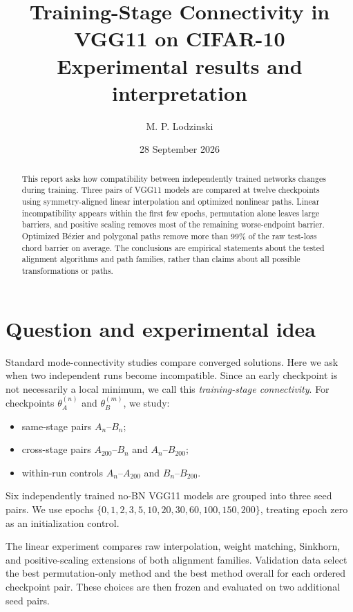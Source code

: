 \documentclass[11pt]{article}
\title{Training-Stage Connectivity in VGG11 on CIFAR-10\\
\large Experimental results and interpretation}
\author{M. P. Lodzinski}
\date{28 September 2026}
\begin{document}
\maketitle

\begin{abstract}
This report asks how compatibility between independently trained networks
changes during training.  Three pairs of VGG11 models are compared at twelve
checkpoints using symmetry-aligned linear interpolation and optimized nonlinear
paths.  Linear incompatibility appears within the first few epochs, permutation
alone leaves large barriers, and positive scaling removes most of the
remaining worse-endpoint barrier.  Optimized B\'ezier and polygonal paths remove
more than 99\% of the raw test-loss chord barrier on average.  The conclusions
are empirical statements about the tested alignment algorithms and path
families, rather than claims about all possible transformations or paths.
\end{abstract}

\section{Question and experimental idea}

Standard mode-connectivity studies compare converged solutions.  Here we ask
when two independent runs become incompatible.  Since an early checkpoint is
not necessarily a local minimum, we call this \emph{training-stage
connectivity}.  For checkpoints $\theta_A^{(n)}$ and $\theta_B^{(m)}$, we study:

\begin{itemize}
    \item same-stage pairs $A_n$--$B_n$;
    \item cross-stage pairs $A_{200}$--$B_n$ and $A_n$--$B_{200}$;
    \item within-run controls $A_n$--$A_{200}$ and $B_n$--$B_{200}$.
\end{itemize}

Six independently trained no-BN VGG11 models are grouped into three seed
pairs.  We use epochs
$\{0,1,2,3,5,10,20,30,60,100,150,200\}$, treating epoch zero as an
initialization control.

The linear experiment compares raw interpolation, weight matching, Sinkhorn,
and positive-scaling extensions of both alignment families.  Validation data
select the best permutation-only method and the best method overall for each
ordered checkpoint pair.  These choices are then frozen and evaluated on two
additional seed pairs.
\end{document}
